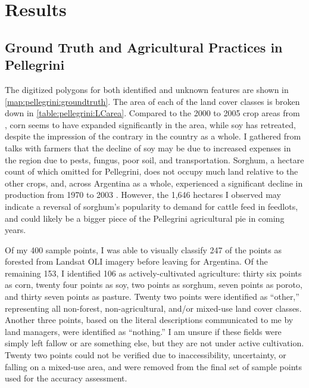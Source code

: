 \chapter{Results}
\label{chapter:results}

\section{Ground Truth and Agricultural Practices in Pellegrini}

The digitized polygons for both identified and unknown features are shown in \autoref{map:pellegrini:groundtruth}. The area of each of the land cover classes is broken down in \autoref{table:pellegrini:LCarea}. Compared to the 2000 to 2005 crop areas from \textcite{volante2005analisis}, corn seems to have expanded significantly in the area, while soy has retreated, despite the impression of the contrary in the country as a whole. I gathered from talks with farmers that the decline of soy may be due to increased expenses in the region due to pests, fungus, poor soil, and transportation. Sorghum, a hectare count of which \citeauthor{volante2005analisis} omitted for Pellegrini, does not occupy much land relative to the other crops, and, across Argentina as a whole, experienced a significant decline in production from 1970 to 2003 \autocite{paruelo2005expansion}. However, the 1,646 hectares I observed may indicate a reversal of sorghum's popularity to demand for cattle feed in feedlots, and could likely be a bigger piece of the Pellegrini agricultural pie in coming years.

Of my 400 sample points, I was able to visually classify 247 of the points as forested from Landsat OLI imagery before leaving for Argentina. Of the remaining 153, I identified 106 as actively-cultivated agriculture: thirty six points as corn, twenty four points as soy, two points as sorghum, seven points as poroto, and thirty seven points as pasture. Twenty two points were identified as ``other,'' representing all non-forest, non-agricultural, and/or mixed-use land cover classes. Another three points, based on the literal descriptions communicated to me by land managers, were identified as ``nothing.'' I am unsure if these fields were simply left fallow or are something else, but they are not under active cultivation. Twenty two points could not be verified due to inaccessibility, uncertainty, or falling on a mixed-use area, and were removed from the final set of sample points used for the accuracy assessment.


